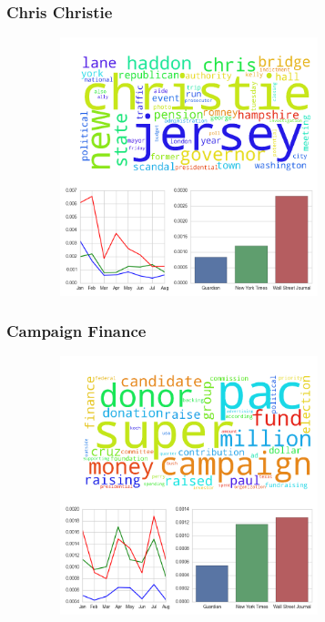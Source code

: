 \documentclass[11pt]{beamer}
\begin{document}

\begin{frame}
\frametitle{Chris Christie}

\begin{figure}
\centering
\includegraphics[width=85mm,height=75mm]{figures/source_topic1.png}
\end{figure} 

\end{frame}


\begin{frame}
\frametitle{Campaign Finance}

\begin{figure}
\centering
\includegraphics[width=85mm,height=75mm]{figures/source_topic2.png}
\end{figure} 

\end{frame}
\end{document}
